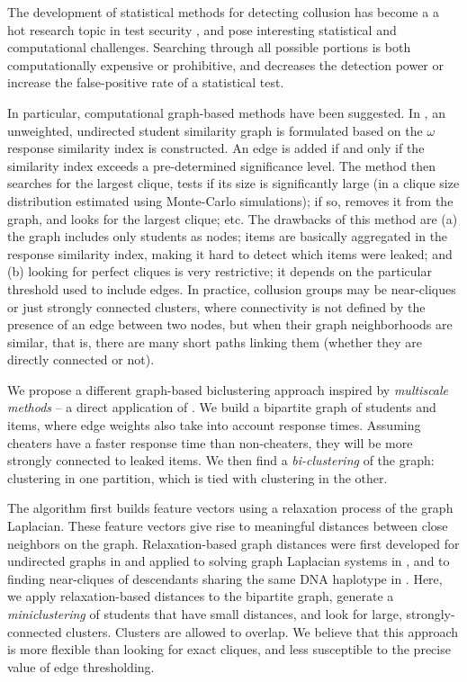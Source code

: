 \documentclass{article}
\begin{document}
The development of statistical methods for detecting collusion has become a a hot research topic in test security \cite{refs}, and pose interesting statistical and computational challenges. Searching through all possible portions is both computationally expensive or prohibitive, and decreases the detection power or increase the false-positive rate of a statistical test.

In particular, computational graph-based methods have been suggested. In \cite{belov}, an unweighted, undirected student similarity graph is formulated based on the $\omega$ response similarity index is constructed. An edge is added if and only if the similarity index exceeds a pre-determined significance level. The method then searches for the largest clique, tests if its size is significantly large (in a clique size distribution estimated using Monte-Carlo simulations); if so, removes it from the graph, and looks for the largest clique; etc. The drawbacks of this method are (a) the graph includes only students as nodes; items are basically aggregated in the response similarity index, making it hard to detect which items were leaked; and (b) looking for perfect cliques is very restrictive; it depends on the particular threshold used to include edges. In practice, collusion groups may be near-cliques or just strongly connected clusters, where connectivity is not defined by the presence of an edge between two nodes, but when their graph neighborhoods are similar, that is, there are many short paths linking them (whether they are directly connected or not).

We propose a different graph-based biclustering approach inspired by {\it multiscale methods} -- a direct application of \cite[Sec.~10]{msgd}. We build a bipartite graph of students and items, where edge weights also take into account response times. Assuming cheaters have a faster response time than non-cheaters, they will be more strongly connected to leaked items. We then find a {\it bi-clustering} of the graph: clustering in one partition, which is tied with clustering in the other.

The algorithm first builds feature vectors using a relaxation process of the graph Laplacian. These feature vectors give rise to meaningful distances between close neighbors on the graph. Relaxation-based graph distances were first developed for undirected graphs in \cite{safro} and applied to solving graph Laplacian systems in \cite{lamg}, and to finding near-cliques of descendants sharing the same DNA haplotype in \cite{primal}. Here, we apply relaxation-based distances to the bipartite graph, generate a {\it miniclustering} of students that have small distances, and look for large, strongly-connected clusters. Clusters are allowed to overlap. We believe that this approach is more flexible than looking for exact cliques, and less susceptible to the precise value of edge thresholding.
\end{document}
